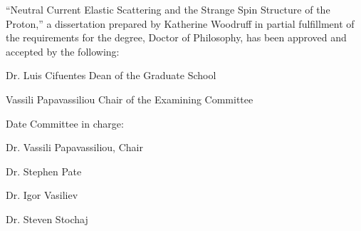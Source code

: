 \noindent
``Neutral Current Elastic Scattering and the Strange Spin Structure of the Proton,'' 
a dissertation prepared by
Katherine Woodruff 
in partial fulfillment of the requirements for the degree, 
Doctor of Philosophy,
has been approved and accepted by the following:

\setlength{\baselineskip}{\singlespace}
\vspace{0.1in}
\begin{flushleft}
\hrulefill
\newline
Dr. Luis Cifuentes
\newline
Dean of the Graduate School
\vspace{0.5in}

\hrulefill
\newline
Vassili Papavassiliou
\newline
Chair of the Examining Committee
\vspace{0.5in}

\hrulefill
\newline
Date
\vspace{0.5in}
\newline
Committee in charge:
\end{flushleft}

\setlength{\baselineskip}{\doublespace}
Dr. Vassili Papavassiliou, Chair

Dr. Stephen Pate

Dr. Igor Vasiliev

Dr. Steven Stochaj

\newpage
